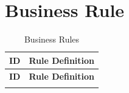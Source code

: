 \section{Business Rule}

\renewcommand{\arraystretch}{1.5}

\begin{longtable}{|c|p{12cm}|}

\caption{Business Rules}
\label{tab:businessrules}
\\

\hline
\rowcolor{orange!30} 
\textbf{ID} 
&
\centering\arraybackslash\textbf{Rule Definition}
\\ \hline
\endfirsthead

\hline
\rowcolor{orange!30}
\textbf{ID}
&
\centering\arraybackslash\textbf{Rule Definition}
\\ \hline
\endhead

\hline
\endfoot

\hline
\endlastfoot


\end{longtable}
